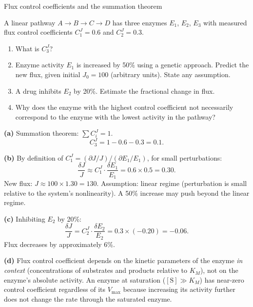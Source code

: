 \documentclass[12pt, a4paper, oneside]{report}
\begin{document}
\begin{problem}{\enspace{}\enspace
  Flux control coefficients and the summation theorem}

  A linear pathway $A \to B \to C \to D$ has three enzymes $E_1$,
  $E_2$, $E_3$ with measured flux control coefficients
  $C_1^J = 0.6$ and $C_2^J = 0.3$.

  \begin{enumerate}
    \item What is $C_3^J$?
    \item Enzyme activity $E_1$ is increased by 50\% using a genetic
          approach. Predict the new flux, given initial $J_0 = 100$
          (arbitrary units). State any assumption.
    \item A drug inhibits $E_2$ by 20\%. Estimate the fractional
          change in flux.
    \item Why does the enzyme with the highest control coefficient
          not necessarily correspond to the enzyme with the lowest
          activity in the pathway?
  \end{enumerate}
\end{problem}

\begin{solution}
  \textbf{(a)} Summation theorem: $\sum C_i^J = 1$.
  \[
    C_3^J = 1 - 0.6 - 0.3 = 0.1.
  \]

  \textbf{(b)} By definition of $C_1^J = (\partial J/J)/(\partial E_1/E_1)$,
  for small perturbations:
  \[
    \frac{\delta J}{J} \approx C_1^J \cdot \frac{\delta E_1}{E_1}
    = 0.6 \times 0.5 = 0.30.
  \]
  New flux: $J \approx 100 \times 1.30 = 130$. Assumption: linear
  regime (perturbation is small relative to the system's nonlinearity).
  A 50\% increase may push beyond the linear regime.

  \textbf{(c)} Inhibiting $E_2$ by 20\%:
  \[
    \frac{\delta J}{J} = C_2^J \cdot \frac{\delta E_2}{E_2}
    = 0.3 \times (-0.20) = -0.06.
  \]
  Flux decreases by approximately 6\%.

  \textbf{(d)} Flux control coefficient depends on the kinetic
  parameters of the enzyme \emph{in context} (concentrations of
  substrates and products relative to $K_M$), not on the enzyme's
  absolute activity. An enzyme at saturation ($[\mathrm{S}] \gg K_M$)
  has near-zero control coefficient regardless of its $V_{\max}$
  because increasing its activity further does not change the rate
  through the saturated enzyme.
\end{solution}
\end{document}
